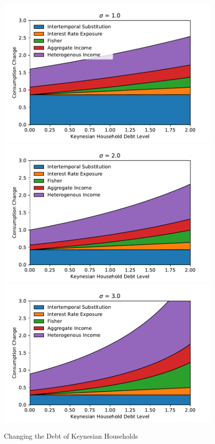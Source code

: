\documentclass[titlepage]{\econtex}\newcommand{\texname}{ConsumptionHeterogeneity}
\begin{document}
\begin{figure} 
	\begin{centering}
		\includegraphics[scale=0.55]{../Python/DoloCode/Figures/KeynesianDebt_sigma1.pdf}
		\includegraphics[scale=0.55]{../Python/DoloCode/Figures/KeynesianDebt_sigma2.pdf}
		\includegraphics[scale=0.55]{../Python/DoloCode/Figures/KeynesianDebt_sigma3.pdf}
		\caption{Changing the Debt of Keynesian Households}
		\label{fig:KeynesianDebt}
	\end{centering}
\end{figure}
\end{document}
